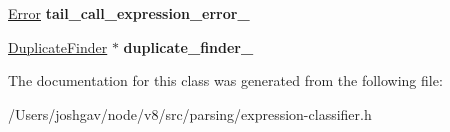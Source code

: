 \begin{DoxyCompactItemize}
\item 
\hyperlink{structv8_1_1internal_1_1_expression_classifier_1_1_error}{Error} {\bfseries tail\+\_\+call\+\_\+expression\+\_\+error\+\_\+}\hypertarget{classv8_1_1internal_1_1_expression_classifier_a5e770087c8d6db3e0dbc92499a4ec3ab}{}\label{classv8_1_1internal_1_1_expression_classifier_a5e770087c8d6db3e0dbc92499a4ec3ab}

\item 
\hyperlink{classv8_1_1internal_1_1_duplicate_finder}{Duplicate\+Finder} $\ast$ {\bfseries duplicate\+\_\+finder\+\_\+}\hypertarget{classv8_1_1internal_1_1_expression_classifier_a34515eff067c3e5d34eebaa6a712cf75}{}\label{classv8_1_1internal_1_1_expression_classifier_a34515eff067c3e5d34eebaa6a712cf75}

\end{DoxyCompactItemize}


The documentation for this class was generated from the following file\+:\begin{DoxyCompactItemize}
\item 
/\+Users/joshgav/node/v8/src/parsing/expression-\/classifier.\+h\end{DoxyCompactItemize}
